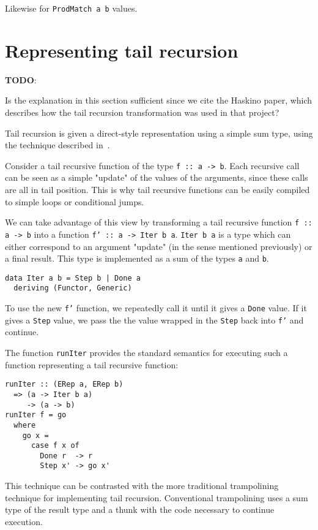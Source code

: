 \documentclass[sigplan,anonymous,review]{acmart}
\newcommand{\ttt}{\texttt}
\newenvironment{todo}
  {\begin{tcolorbox}
   \textbf{TODO}:
  }
  {\end{tcolorbox}
  }
\begin{document}
Likewise for \ttt{ProdMatch a b} values.

\section{Representing tail recursion}
\begin{todo}
  Is the explanation in this section sufficient since we cite the Haskino paper,
  which describes how the tail recursion transformation was used in that project?
\end{todo}

Tail recursion is given a direct-style representation using a simple sum type,
using the technique described in~\cite{Grebe:2017:RSD:3136040.3136048}.

Consider a tail recursive function of the type \ttt{f :: a -> b}. Each recursive
call can be seen as a simple "update" of the values of the arguments, since
these calls are all in tail position. This is why tail recursive functions
can be easily compiled to simple loops or conditional jumps.

We can take advantage of this view by transforming a tail recursive function
\ttt{f :: a -> b} into a function \ttt{f' :: a -> Iter b a}. \ttt{Iter b a} is a
type which can either correspond to an argument "update" (in the sense mentioned
previously) or a final result. This type is implemented as a sum of the types
\ttt{a} and \ttt{b}.

\begin{lstlisting}
data Iter a b = Step b | Done a
  deriving (Functor, Generic)
\end{lstlisting}

To use the new \ttt{f'} function, we repeatedly call it until it gives a
\ttt{Done} value. If it gives a \ttt{Step} value, we pass the the value wrapped
in the \ttt{Step} back into \ttt{f'} and continue.

The function \ttt{runIter} provides the standard semantics for executing such a
function representing a tail recursive function:

\begin{lstlisting}
runIter :: (ERep a, ERep b)
  => (a -> Iter b a)
     -> (a -> b)
runIter f = go
  where
    go x =
      case f x of
        Done r  -> r
        Step x' -> go x'
\end{lstlisting}

This technique can be contrasted with the more traditional trampolining
technique for implementing tail recursion. Conventional trampolining uses a
sum type of the result type and a thunk with the code necessary to continue
execution.~\cite{Ganz:99:Trampolined}
\end{document}
